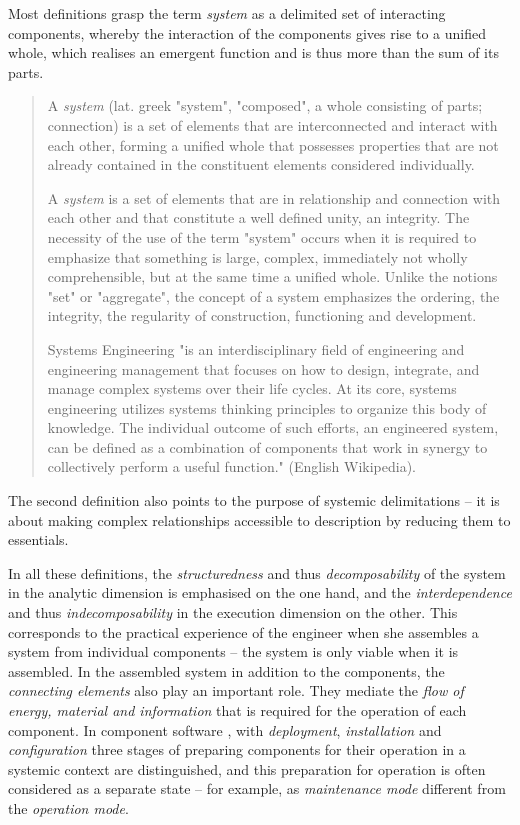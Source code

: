 \documentclass[11pt,a4paper]{article}
\begin{document}
Most definitions grasp the term \emph{system} as a delimited set of
interacting components, whereby the interaction of the components gives rise
to a unified whole, which realises an emergent function and is thus more than
the sum of its parts.
\begin{quote}
  A \emph{system} (lat. greek "system", "composed", a whole consisting of
  parts; connection) is a set of elements that are interconnected and interact
  with each other, forming a unified whole that possesses properties that are
  not already contained in the constituent elements considered individually.
  \cite{Petrov2020}

  A \emph{system} is a set of elements that are in relationship and connection
  with each other and that constitute a well defined unity, an integrity. The
  necessity of the use of the term "system" occurs when it is required to
  emphasize that something is large, complex, immediately not wholly
  comprehensible, but at the same time a unified whole. Unlike the notions
  "set" or "aggregate", the concept of a system emphasizes the ordering, the
  integrity, the regularity of construction, functioning and development.
  \cite{TOP}

  Systems Engineering "is an interdisciplinary field of engineering and
  engineering management that focuses on how to design, integrate, and manage
  complex systems over their life cycles. At its core, systems engineering
  utilizes systems thinking principles to organize this body of knowledge. The
  individual outcome of such efforts, an engineered system, can be defined as
  a combination of components that work in synergy to collectively perform a
  useful function." (English Wikipedia).
\end{quote}
The second definition also points to the purpose of systemic delimitations --
it is about making complex relationships accessible to description by reducing
them to essentials.

In all these definitions, the \emph{structuredness} and thus
\emph{decomposability} of the system in the analytic dimension is emphasised
on the one hand, and the \emph{interdependence} and thus
\emph{indecomposability} in the execution dimension on the other. This
corresponds to the practical experience of the engineer when she assembles a
system from individual components -- the system is only viable when it is
assembled. In the assembled system in addition to the components, the
\emph{connecting elements} also play an important role.  They mediate the
\emph{flow of energy, material and information} that is required for the
operation of each component. In component software \cite{Szyperski2002}, with
\emph{deployment}, \emph{installation} and \emph{configuration} three stages
of preparing components for their operation in a systemic context are
distinguished, and this preparation for operation is often considered as a
separate state -- for example, as \emph{maintenance mode} different from the
\emph{operation mode}.
\end{document}

